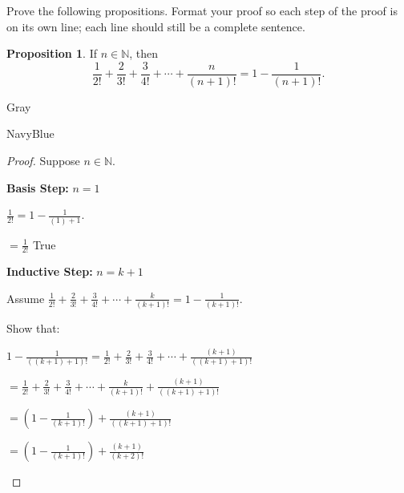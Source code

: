 \documentclass[12pt]{amsart}
\theoremstyle{named}
\newenvironment{prf}
{\medskip\begin{color}{Gray}\begin{framed}\begin{color}{NavyBlue}\begin{proof}[Proof]
\doublespacing}
{\end{proof}\end{color}\end{framed}\end{color}\medskip}
\theoremstyle{definition}
\newtheorem{proposition}{Proposition}
\newcommand{\N}{\mathbb N}
\begin{document}
Prove the following propositions. Format your proof so each step of the proof is on its own line; each line should still be a complete sentence.\\

\begin{proposition}
	If $n\in\N$, then
	$$\frac{1}{2!}+\frac{2}{3!}+\frac{3}{4!}+\cdots+\frac{n}{(n+1)!} = 1 - \frac{1}{(n+1)!}.$$
	
\end{proposition}

\begin{prf}
	\phantom{ }

	Suppose $n \in \mathbb N$.

	\textbf{Basis Step:} $n = 1$
	\begin{adjustwidth}{2em}{0em}
		$\displaystyle\frac{1}{2!} = 1 - \frac{1}{(1)+1}$.

		\hspace*{1.3em}$\displaystyle = \frac{1}{2!}$ \hspace*{1em}\checkmark True
	\end{adjustwidth}

	\phantom{ }

	\textbf{Inductive Step:} $n = k + 1$
	\begin{adjustwidth}{2em}{0em}
		Assume $\displaystyle \frac{1}{2!}+\frac{2}{3!}+\frac{3}{4!}+\cdots+\frac{k}{(k+1)!} = 1 - \frac{1}{(k+1)!}$.
		
		Show that: 

		$\displaystyle 1 - \frac{1}{((k+1)+1)!} = \frac{1}{2!}+\frac{2}{3!}+\frac{3}{4!}+\cdots+\frac{(k+1)}{((k+1)+1)!}$

		\vspace*{0.5em}

		\hspace*{8.105em}$\displaystyle = \frac{1}{2!}+\frac{2}{3!}+\frac{3}{4!}+\cdots+\frac{k}{(k+1)!} +\frac{(k+1)}{((k+1)+1)!}$
		
		\vspace*{0.5em}
		
		\hspace*{8.105em}$\displaystyle = (1 - \frac{1}{(k+1)!}) +\frac{(k+1)}{((k+1)+1)!}$

		\vspace*{0.5em}

		\hspace*{8.105em}$\displaystyle = (1 - \frac{1}{(k+1)!}) +\frac{(k+1)}{(k+2)!}$


\end{adjustwidth}
\end{prf}
\end{document}
